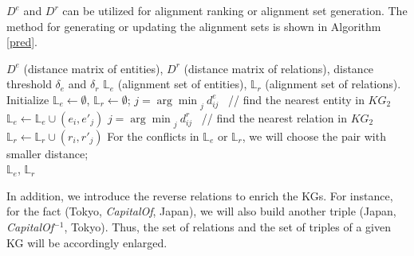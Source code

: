 \documentclass[letterpaper]{article} %
\begin{document}
$D^e$ and $D^r$ can be utilized for alignment ranking or alignment set generation. The method for generating or updating the alignment sets is shown in Algorithm \ref{pred}.

\begin{algorithm}[H]
\caption{Update Alignment Sets} 
\label{pred}
\begin{algorithmic}[1]
\Require $D^e$ (distance matrix of entities), $D^r$ (distance matrix
of relations), distance threshold $\delta_e$ and $\delta_r$ \Ensure
$\mathbb{L}_e$ (alignment set of entities), $\mathbb{L}_r$
(alignment set of relations). \State Initialize
$\mathbb{L}_e \leftarrow \emptyset$, $\mathbb{L}_r \leftarrow
\emptyset$;  \State $j =
{\arg\min}_{j}\ {d^e_{ij}}$ \  // find the nearest entity in $KG_2$
 \State $\mathbb{L}_e \leftarrow
\mathbb{L}_e \cup (e_i,e'_j)$ \EndIf \EndFor {} \State $j = {\arg\min}_{j}\ {d^r_{ij}}$ \ // find
the nearest relation in $KG_2$  \State
$\mathbb{L}_r \leftarrow \mathbb{L}_r \cup (r_i,r'_j)$ \EndIf
\EndFor \State For the conflicts in $\mathbb{L}_e$ or $\mathbb{L}_r$,
we will choose the pair with smaller distance;
\\
\Return $\mathbb{L}_e$, $\mathbb{L}_r$
\end{algorithmic}
\end{algorithm}


In addition, we introduce the reverse relations to enrich the KGs.
For instance, for the fact (Tokyo, \emph{CapitalOf}, Japan), we will
also build another triple (Japan, \emph{CapitalOf}$^{-1}$, Tokyo).
Thus, the set of relations and the set of triples of a given KG will
be accordingly enlarged.

%
\end{document}
